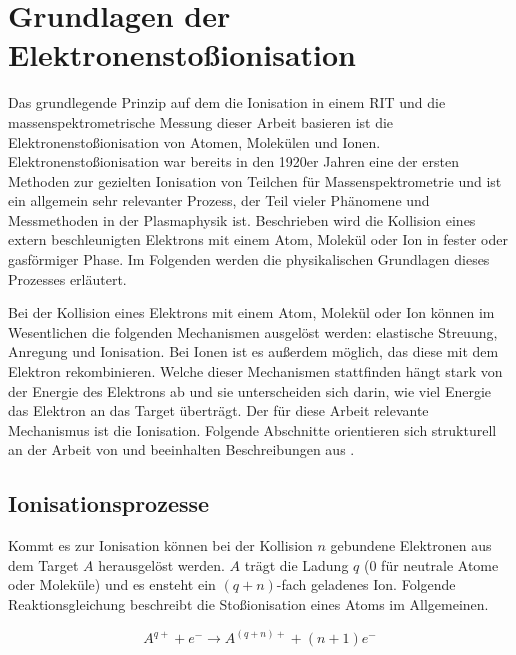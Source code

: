 \chapter{Grundlagen der Elektronenstoßionisation}
\label{chap:ion}
Das grundlegende Prinzip auf dem die Ionisation in einem RIT und die massenspektrometrische Messung dieser Arbeit basieren ist die Elektronenstoßionisation von Atomen, Molekülen und Ionen. 
Elektronenstoßionisation war bereits in den 1920er Jahren eine der ersten Methoden zur gezielten Ionisation von Teilchen für Massenspektrometrie und ist ein allgemein sehr relevanter Prozess, der Teil vieler Phänomene und Messmethoden in der Plasmaphysik ist. Beschrieben wird die Kollision eines extern beschleunigten Elektrons mit einem Atom, Molekül oder Ion in fester oder gasförmiger Phase. Im Folgenden werden die physikalischen Grundlagen dieses Prozesses erläutert. 

Bei der Kollision eines Elektrons mit einem Atom, Molekül oder Ion können im Wesentlichen die folgenden Mechanismen ausgelöst werden: elastische Streuung, Anregung und Ionisation. Bei Ionen ist es außerdem möglich, das diese mit dem Elektron rekombinieren. Welche dieser Mechanismen stattfinden hängt stark von der Energie des Elektrons ab und sie unterscheiden sich darin, wie viel Energie das Elektron an das Target überträgt. Der für diese Arbeit relevante Mechanismus ist die Ionisation. Folgende Abschnitte orientieren sich strukturell an der Arbeit von \cite{Ebinger} und beeinhalten Beschreibungen aus \cite{EII}.

\section{Ionisationsprozesse}
Kommt es zur Ionisation können bei der Kollision $n$ gebundene Elektronen aus dem Target $A$ herausgelöst werden. $A$ trägt die Ladung $q$ (0 für neutrale Atome oder Moleküle) und es ensteht ein $(q+n)$-fach geladenes Ion. Folgende Reaktionsgleichung beschreibt die Stoßionisation eines Atoms im Allgemeinen.

\begin{equation}
     A^{q+} + e^- \rightarrow A^{(q+n)+} + (n + 1) e^-
\end{equation}

